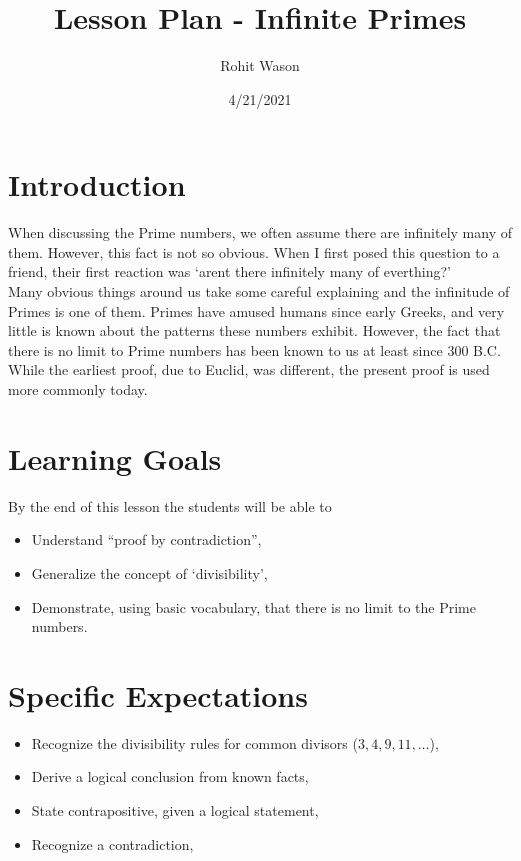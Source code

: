 \documentclass{article}
\author{Rohit Wason}
\title{Lesson Plan - Infinite Primes}
\date{4/21/2021}
\begin{document}
\maketitle

\section*{Introduction}
When discussing the Prime numbers, we often assume there are infinitely
many of them. However, this fact is not so obvious. When I first posed this
question to a friend, their first reaction was `aren\textquotesingle t there infinitely many of 
everthing?'\\

Many obvious things around us take some careful explaining and the infinitude of Primes
is one of them. Primes have amused humans since early Greeks, and very
little is known about the patterns these numbers exhibit. However, the fact that there
is no limit to Prime numbers has been known to us at least since 300 B.C. While the
earliest proof, due to Euclid, was different, the present proof is used more commonly today.

\section*{Learning Goals}
By the end of this lesson the students will be able to
\begin{itemize}
  \item Understand ``proof by contradiction'',
  \item Generalize the concept of `divisibility',
  \item Demonstrate, using basic vocabulary, that there is no limit to the Prime numbers.
\end{itemize}

\section*{Specific Expectations}
\begin{itemize}
  \item Recognize the divisibility rules for common divisors ($3,4,9,11,\dots$),
  \item Derive a logical conclusion from known facts,
  \item State contrapositive, given a logical statement,
  \item Recognize a contradiction,
\end{itemize}
\end{document}
